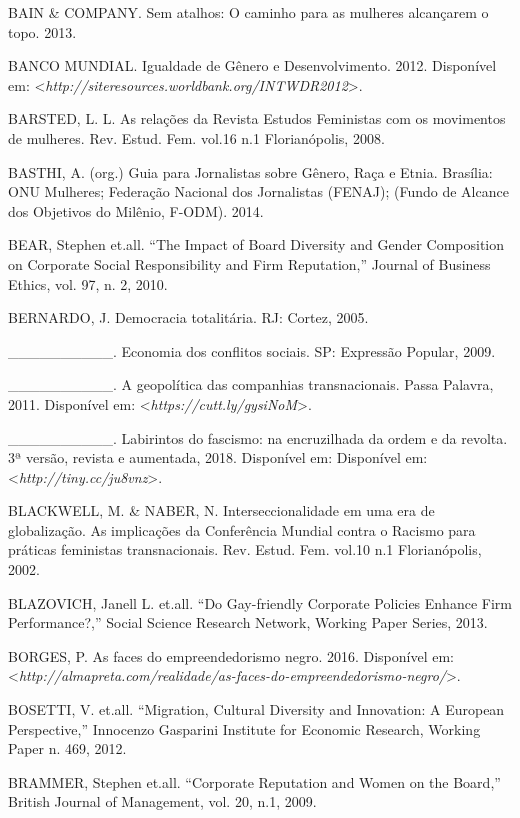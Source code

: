 \begin{Parskip}
BAIN \& COMPANY. Sem atalhos: O caminho para as mulheres alcançarem o
topo. 2013.

BANCO MUNDIAL. Igualdade de Gênero e Desenvolvimento. 2012.
Disponível em: \textless{}\emph{http://siteresources.worldbank.org/INTWDR2012}\textgreater{}.

BARSTED, L. L. As relações da Revista Estudos Feministas com os
movimentos de mulheres. Rev. Estud. Fem. vol.16 n.1 Florianópolis, 2008.

BASTHI, A. (org.) Guia para Jornalistas sobre Gênero, Raça e Etnia.
Brasília: ONU Mulheres; Federação Nacional dos Jornalistas (FENAJ);
(Fundo de Alcance dos Objetivos do Milênio, F-ODM). 2014.

BEAR, Stephen et.all. ``The Impact of Board Diversity and Gender
Composition on Corporate Social Responsibility and Firm Reputation,''
Journal of Business Ethics, vol. 97, n. 2, 2010.

BERNARDO, J. Democracia totalitária. RJ: Cortez, 2005.

\_\_\_\_\_\_\_\_\_\_. Economia dos conflitos sociais. SP: Expressão
Popular, 2009.

\_\_\_\_\_\_\_\_\_\_. A geopolítica das companhias transnacionais. Passa
Palavra, 2011. Disponível em: \textless{}\emph{https://cutt.ly/gysiNoM}\textgreater{}.

\_\_\_\_\_\_\_\_\_\_. Labirintos do fascismo: na encruzilhada da ordem e
da revolta. 3ª versão, revista e aumentada, 2018. Disponível em:
Disponível em: \textless{}\emph{http://tiny.cc/ju8vnz}\textgreater{}.

BLACKWELL, M. \& NABER, N. Interseccionalidade em uma era de
globalização. As implicações da Conferência Mundial contra o Racismo
para práticas feministas transnacionais. Rev. Estud. Fem. vol.10 n.1
Florianópolis, 2002.

BLAZOVICH, Janell L. et.all. ``Do Gay-friendly Corporate Policies
Enhance Firm Performance?,'' Social Science Research Network, Working
Paper Series, 2013.

BORGES, P. As faces do empreendedorismo negro. 2016.
Disponível em: \textless{}\emph{http://almapreta.com/realidade/as-faces-do-empreendedorismo-negro/}\textgreater{}.

BOSETTI, V. et.all. ``Migration, Cultural Diversity and Innovation: A
European Perspective,'' Innocenzo Gasparini Institute for Economic
Research, Working Paper n. 469, 2012.

BRAMMER, Stephen et.all. ``Corporate Reputation and Women on the
Board,'' British Journal of Management, vol. 20, n.1, 2009.


\end{Parskip}
